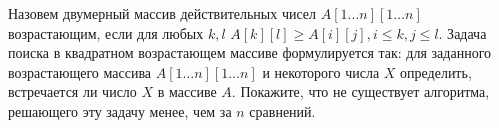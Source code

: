 \documentclass{article}
\begin{document}
Назовем двумерный массив действительных чисел $A[1\ldots n][1\ldots n]$ возрастающим, если для любых $k,l$ $A[k][l] \geqslant A[i][j], i \leqslant k, j \leqslant l$. Задача поиска в квадратном возрастающем массиве формулируется так: для заданного возрастающего массива $A[1\ldots n][1\ldots n]$ и некоторого числа $X$ определить, 
встречается ли число $X$ в массиве $A$. Покажите, что не существует алгоритма, решающего эту задачу менее, чем за $n$ сравнений.
\end{document}
